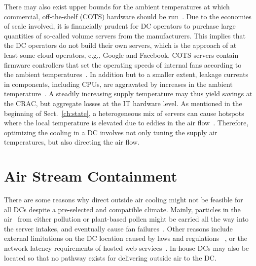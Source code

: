 \documentclass[officiallayout]{tktla}
\begin{document}
There may also exist upper bounds for the ambient temperatures at which
commercial, off-the-shelf (COTS) hardware should be
run~\cite{Malone2008,Patterson2008,Moss2010}. Due to the economies of scale
involved, it is financially prudent for DC operators to purchase large
quantities of so-called volume servers from the manufacturers. This implies
that the DC operators do not build their own servers, which is the approach of
at least some cloud operators, e.g., Google and Facebook. COTS servers contain
firmware controllers that set the operating speeds of internal fans according
to the ambient temperatures~\cite{Moss2010}. In addition but to a smaller
extent, leakage currents in components, including CPUs, are aggravated by
increases in the ambient temperature~\cite{Patterson2008}. A steadily
increasing supply temperature may thus yield savings at the CRAC, but
aggregate losses at the IT hardware level. As mentioned in the beginning of
Sect.~\ref{ch:state}, a heterogeneous mix of servers can cause hotspots where
the local temperature is elevated due to eddies in the air
flow~\cite{Moss2010}.  Therefore, optimizing the cooling in a DC involves not
only tuning the supply air temperatures, but also directing the air flow.



\section{Air Stream Containment}
\label{sec:air}

There are some reasons why direct outside air cooling might not be feasible
for all DCs despite a pre-selected and compatible climate. Mainly, particles
in the air~\cite{McKeown1986,Schmidt2002,Greenberg2006,Atwood2008,Belady2008}
from either pollution or plant-based pollen might be carried all the way into
the server intakes, and eventually cause fan failures~\cite{Pervila2013}.
Other reasons include external limitations on the DC location caused by laws
and regulations ~\cite{Bailey2006,Gallagher2013}, or the network latency
requirements of hosted web services~\cite{Glantz2013}. In-house DCs may also
be located so that no pathway exists for delivering outside air to the DC.
\end{document}
